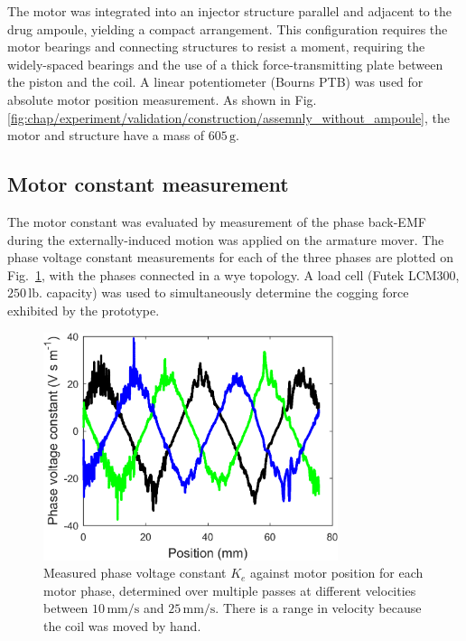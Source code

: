     
            The motor was integrated into an injector structure parallel and adjacent to the drug ampoule, yielding a compact arrangement. This configuration requires the motor bearings and connecting structures to resist a moment, requiring the widely-spaced bearings and the use of a thick force-transmitting plate between the piston and the coil. A linear potentiometer (Bourns PTB) was used for absolute motor position measurement. As shown in Fig.\,\ref{fig:chap/experiment/validation/construction/assemnly_without_ampoule}, the motor and structure have a mass of $605\,\mathrm{g}$.
    

        \subsection{Motor constant measurement}     \label{Chapter:experiment/validation/motor constant}
        
            
            The motor constant was evaluated by measurement of the phase back-EMF during the externally-induced motion was applied on the armature mover. The phase voltage constant measurements for each of the three phases are plotted on Fig.~\ref{fig:chap/experiment/motor_constant/kms_plot}, with the phases connected in a wye topology. A load cell (Futek LCM300, $250\,\mathrm{lb.}$ capacity) was used to simultaneously determine the cogging force exhibited by the prototype. 

        
            \begin{figure}[h]
                \centering
                \includegraphics[width=3.4in]{chap5/images/kms_plot.png}
                \caption{Measured phase voltage constant $K_e$ against motor position for each motor phase, determined over multiple passes at different velocities between $10\,\mathrm{mm/s}$ and $25\,\mathrm{mm/s}$. There is a range in velocity because the coil was moved by hand.}
                \label{fig:chap/experiment/motor_constant/kms_plot}
            \end{figure}


